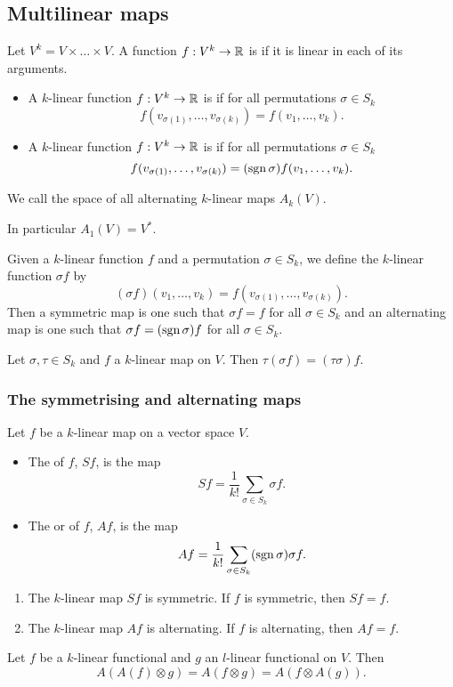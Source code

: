\subsection{Multilinear maps}
\begin{definition}
Let $V^k = V\times \ldots \times V$. A function $f: V^k\to \mathbb{R}$ is  if it is linear in each of its arguments.
\begin{itemize}
\item A $k$-linear function $f:V^k\to \mathbb{R}$ is  if for all permutations $\sigma\in S_k$
\[ f(v_{\sigma(1)},\ldots, v_{\sigma(k)}) = f(v_1,\ldots, v_k). \]
\item A $k$-linear function $f:V^k\to \mathbb{R}$ is  if for all permutations $\sigma\in S_k$
\[ f(v_{\sigma(1)},\ldots, v_{\sigma(k)}) = (\operatorname{sgn}\sigma)f(v_1,\ldots, v_k). \]
\end{itemize}
We call the space of all alternating $k$-linear maps $A_k(V)$.
\end{definition}
In particular $A_1(V) = V^*$.
\begin{note}
Given a $k$-linear function $f$ and a permutation $\sigma\in S_k$, we define the $k$-linear function $\sigma f$ by
\[ (\sigma f)(v_1,\ldots, v_k) = f(v_{\sigma(1)},\ldots, v_{\sigma(k)}). \]
Then a symmetric map is one such that $\sigma f = f$ for all $\sigma\in S_k$ and an alternating map is one such that $\sigma f = (\operatorname{sgn} \sigma)f$ for all $\sigma\in S_k$.
\end{note} 
\begin{lemma}
Let $\sigma,\tau \in S_k$ and $f$ a $k$-linear map on $V$. Then $\tau(\sigma f) = (\tau \sigma)f$.
\end{lemma}
\subsubsection{The symmetrising and alternating maps}
\begin{definition}
Let $f$ be a $k$-linear map on a vector space $V$.
\begin{itemize}
\item The  of $f$, $Sf$, is the map
\[ Sf = \frac{1}{k!}\sum_{\sigma\in S_k}\sigma f. \]
\item The  or  of $f$, $Af$, is the map
\[ Af = \frac{1}{k!}\sum_{\sigma\in S_k}(\operatorname{sgn} \sigma)\sigma f. \]
\end{itemize}
\end{definition}
\begin{lemma}
\begin{enumerate}
\item The $k$-linear map $Sf$ is symmetric. If $f$ is symmetric, then $Sf = f$.
\item The $k$-linear map $Af$ is alternating. If $f$ is alternating, then $Af = f$.
\end{enumerate}
\end{lemma}
\begin{lemma} \label{idempotenceA}
Let $f$ be a $k$-linear functional and $g$ an $l$-linear functional on $V$. Then
\[ A(A(f)\otimes g) = A(f\otimes g) = A(f\otimes A(g)). \]
\end{lemma}
